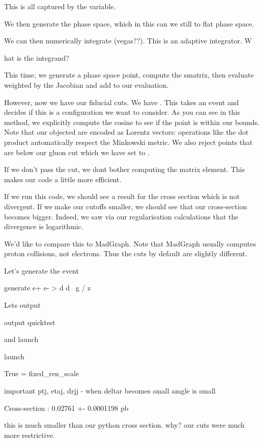 This is all captured by the  variable. 

We then generate the phase space, which in this can we still to flat phase space.

We can then numerically integrate (vegas??). This is an adaptive integrator. W

hat is the integrand?

This time, we generate a phase space point, compute the smatrix, then evaluate weighted by the Jacobian and add to our evaluation. 

However, now we have our fiducial cuts. We have . This takes an event and decides if this is a configuration we want to consider.  As you can see in this method, we explicitly compute the cosine to see if the point is within our bounds. Note that our objected are encoded as Lorentz vectors: operations like the dot product automatically respect the Minkowski metric. We also reject points that are below our gluon cut which we have set to .


If we don't pass the cut, we dont bother computing the matrix element. This makes our code a little more efficient.

If we run this code, we should see a result for the cross section which is not divergent. If we make our cutoffs smaller, we should see that our cross-section becomes bigger. Indeed, we saw via our regularisation calculations that the divergence is logarithmic.

We'd like to compare this to MadGraph. Note that MadGraph usually computes proton collisions, not electrons. Thus the cuts by default are slightly different.

Let's generate the event
\begin{codeenv}
    generate e+ e- > d d~ g / z
\end{codeenv}
Lets output
\begin{codeenv}
   output quicktest
\end{codeenv}
and launch
\begin{codeenv}
    launch
\end{codeenv}

 True = fixed_ren_scale 

 important ptj, etaj, drjj - when deltar becomes small amgle is small

   Cross-section :   0.02761 +- 0.0001198 pb

   this is much smaller than our python cross section. why? our cuts were much more restrictive.

